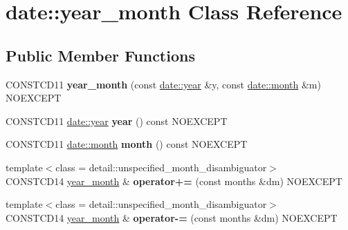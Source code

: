 \hypertarget{classdate_1_1year__month}{}\section{date\+::year\+\_\+month Class Reference}
\label{classdate_1_1year__month}
\subsection*{Public Member Functions}
\begin{DoxyCompactItemize}
\item 
\mbox{\label{classdate_1_1year__month_a72bc1f9b228071ddf311ca69df7c2206}} 
C\+O\+N\+S\+T\+C\+D11 {\bfseries year\+\_\+month} (const \mbox{\hyperlink{classdate_1_1year}{date\+::year}} \&y, const \mbox{\hyperlink{classdate_1_1month}{date\+::month}} \&m) N\+O\+E\+X\+C\+E\+PT
\item 
\mbox{\label{classdate_1_1year__month_a9456ddd47089912798d2cff01a44b119}} 
C\+O\+N\+S\+T\+C\+D11 \mbox{\hyperlink{classdate_1_1year}{date\+::year}} {\bfseries year} () const N\+O\+E\+X\+C\+E\+PT
\item 
\mbox{\label{classdate_1_1year__month_a504e045dc6565c34c0bfa0b360660589}} 
C\+O\+N\+S\+T\+C\+D11 \mbox{\hyperlink{classdate_1_1month}{date\+::month}} {\bfseries month} () const N\+O\+E\+X\+C\+E\+PT
\item 
\mbox{\label{classdate_1_1year__month_a0b82db1c69d6c5d74404f68f5827ca91}} 
{\footnotesize template$<$class  = detail\+::unspecified\+\_\+month\+\_\+disambiguator$>$ }\\C\+O\+N\+S\+T\+C\+D14 \mbox{\hyperlink{classdate_1_1year__month}{year\+\_\+month}} \& {\bfseries operator+=} (const months \&dm) N\+O\+E\+X\+C\+E\+PT
\item 
\mbox{\label{classdate_1_1year__month_a445958f8e47d0c1a7488226180256207}} 
{\footnotesize template$<$class  = detail\+::unspecified\+\_\+month\+\_\+disambiguator$>$ }\\C\+O\+N\+S\+T\+C\+D14 \mbox{\hyperlink{classdate_1_1year__month}{year\+\_\+month}} \& {\bfseries operator-\/=} (const months \&dm) N\+O\+E\+X\+C\+E\+PT
\item 

\end{DoxyCompactItemize}
